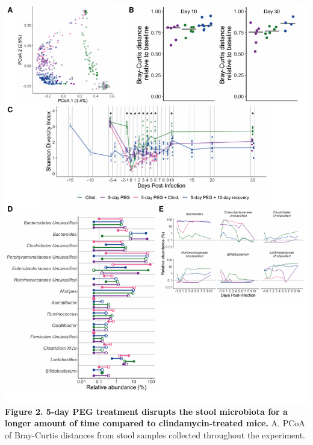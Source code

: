 \documentclass[
  11pt,
]{article}
\begin{document}
\includegraphics{figure_2.pdf} \textbf{Figure 2. 5-day PEG treatment
disrupts the stool microbiota for a longer amount of time compared to
clindamycin-treated mice.} A. PCoA of Bray-Curtis distances from stool
samples collected throughout the experiment. \newpage
\end{document}
